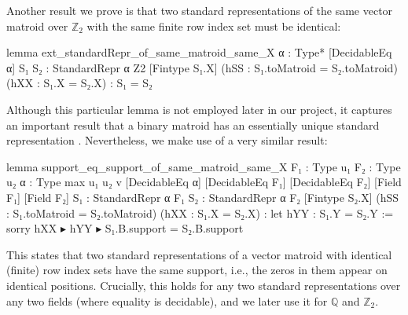 Another result we prove is that two standard representations of the same vector matroid over $\mathbb{Z}_{2}$ with the same finite row index set must be identical:
\begin{leancode}
lemma ext_standardRepr_of_same_matroid_same_X
    {α : Type*} [DecidableEq α]
    {S₁ S₂ : StandardRepr α Z2} [Fintype S₁.X]
    (hSS : S₁.toMatroid = S₂.toMatroid)
    (hXX : S₁.X = S₂.X) :
    S₁ = S₂
\end{leancode}
Although this particular lemma is not employed later in our project, it captures an important result that a binary matroid has an essentially unique standard representation \cite{Oxley2011,Truemper2016}. Nevertheless, we make use of a very similar result:
\begin{leancode}
lemma support_eq_support_of_same_matroid_same_X
    {F₁ : Type u₁} {F₂ : Type u₂}
    {α : Type max u₁ u₂ v} [DecidableEq α]
    [DecidableEq F₁] [DecidableEq F₂]
    [Field F₁] [Field F₂]
    {S₁ : StandardRepr α F₁}
    {S₂ : StandardRepr α F₂}
    [Fintype S₂.X]
    (hSS : S₁.toMatroid = S₂.toMatroid)
    (hXX : S₁.X = S₂.X) :
    let hYY : S₁.Y = S₂.Y := sorry
    hXX ▸ hYY ▸ S₁.B.support = S₂.B.support
\end{leancode}
This states that two standard representations of a vector matroid with identical (finite) row index sets have the same support, i.e., the zeros in them appear on identical positions. Crucially, this holds for any two standard representations over any two fields (where equality is decidable), and we later use it for $\mathbb{Q}$ and $\mathbb{Z}_{2}$.
